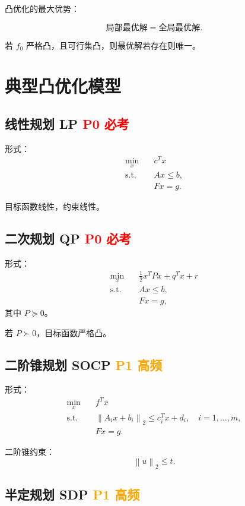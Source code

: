 \documentclass[11pt,a4paper]{ctexart}
\newcommand{\st}{\text{s.t.}}
\newcommand{\norm}[1]{\left\lVert #1 \right\rVert}
\newcommand{\Pzero}{\textcolor{red}{\textbf{P0 必考}}}
\newcommand{\Pone}{\textcolor{orange}{\textbf{P1 高频}}}
\theoremstyle{definition}
\theoremstyle{plain}
\theoremstyle{remark}
\begin{document}
凸优化的最大优势：

\[
    \text{局部最优解} = \text{全局最优解}.
\]

若 $f_0$ 严格凸，且可行集凸，则最优解若存在则唯一。

\section{典型凸优化模型}

\subsection{线性规划 LP \Pzero}

形式：
\[
\begin{aligned}
    \min_x\quad & c^T x\\
    \st\quad & Ax\le b,\\
    & Fx=g.
\end{aligned}
\]

目标函数线性，约束线性。

\subsection{二次规划 QP \Pzero}

形式：
\[
\begin{aligned}
    \min_x\quad & \frac12 x^T P x + q^T x + r\\
    \st\quad & Ax\le b,\\
    & Fx=g,
\end{aligned}
\]
其中 $P\succeq0$。

若 $P\succ0$，目标函数严格凸。

\subsection{二阶锥规划 SOCP \Pone}

形式：
\[
\begin{aligned}
    \min_x\quad & f^T x\\
    \st\quad & \norm{A_i x+b_i}_2 \le c_i^T x+d_i,\quad i=1,\dots,m,\\
    & Fx=g.
\end{aligned}
\]

二阶锥约束：
\[
    \norm{u}_2 \le t.
\]

\subsection{半定规划 SDP \Pone}
\end{document}
